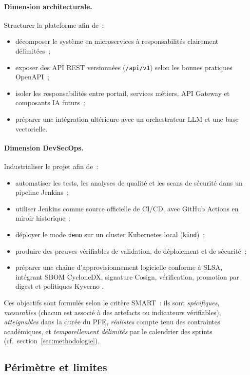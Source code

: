 \paragraph{Dimension architecturale.} Structurer la plateforme afin de~:
\begin{itemize}
    \item décomposer le système en microservices à responsabilités clairement délimitées~;
    \item exposer des API REST versionnées (\texttt{/api/v1}) selon les bonnes pratiques OpenAPI~;
    \item isoler les responsabilités entre portail, services métiers, API Gateway et composants IA futurs~;
    \item préparer une intégration ultérieure avec un orchestrateur LLM et une base vectorielle.
\end{itemize}

\paragraph{Dimension DevSecOps.} Industrialiser le projet afin de~:
\begin{itemize}
    \item automatiser les tests, les analyses de qualité et les scans de sécurité dans un pipeline Jenkins~;
    \item utiliser Jenkins comme source officielle de CI/CD, avec GitHub Actions en miroir historique~;
    \item déployer le mode \texttt{demo} sur un cluster Kubernetes local (\texttt{kind})~;
    \item produire des preuves vérifiables de validation, de déploiement et de sécurité~;
    \item préparer une chaîne d'approvisionnement logicielle conforme à SLSA, intégrant SBOM CycloneDX, signature Cosign, vérification, promotion par digest et politiques Kyverno \cite{slsa_spec_v1,cyclonedx_spec,sigstore_paper}.
\end{itemize}

Ces objectifs sont formulés selon le critère SMART~: ils sont \textit{spécifiques}, \textit{mesurables} (chacun est associé à des artefacts ou indicateurs vérifiables), \textit{atteignables} dans la durée du PFE, \textit{réalistes} compte tenu des contraintes académiques, et \textit{temporellement délimités} par le calendrier des sprints (cf.\ section~\ref{sec:methodologie}).

\subsection{Périmètre et limites}


